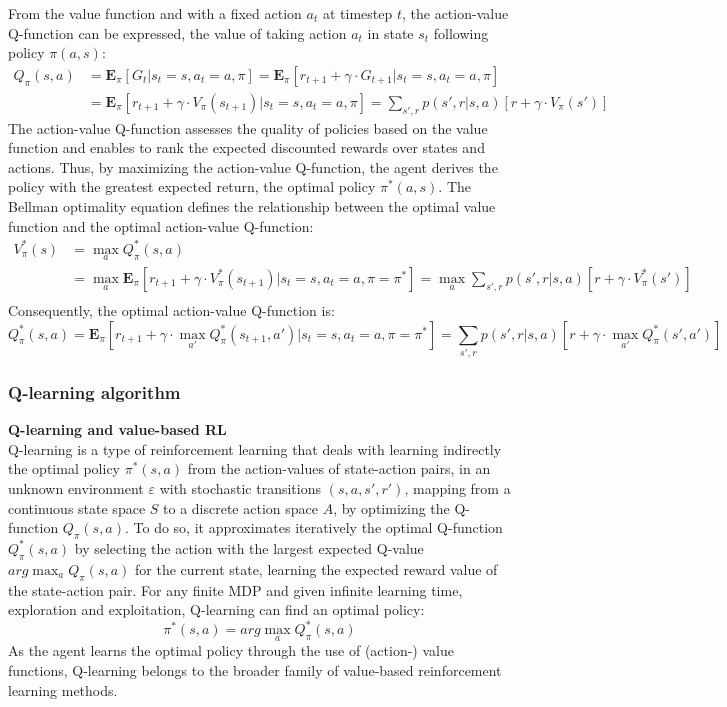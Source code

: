 From the value function and with a fixed action $a_t$ at timestep $t$, the action-value Q-function can be expressed, the value of taking action $a_t$ in state $s_t$ following policy $\pi(a,s)$:
\[
\begin{split}
Q_{\pi}(s,a) &= \mathbf{E}_{\pi}[G_t|s_t=s,a_t=a,\pi] = \mathbf{E}_{\pi}[r_{t+1} + \gamma \cdot G_{t+1}|s_t=s,a_t=a,\pi] \\
&= \mathbf{E}_{\pi}[r_{t+1}+\gamma \cdot V_{\pi}(s_{t+1})|s_t=s,a_t=a,\pi] = \sum_{s',r}p(s',r|s,a)[r+\gamma \cdot V_{\pi}(s')] 
\end{split}
\]
The action-value Q-function assesses the quality of policies based on the value function and enables to rank the expected discounted rewards over states and actions. Thus, by maximizing the action-value Q-function, the agent derives the policy with the greatest expected return, the optimal policy $\pi^*(a,s)$. The  Bellman optimality equation defines the relationship between the optimal value function and the optimal action-value Q-function:
\[ 
\begin{split}
V_\pi^*(s) &= \max_a Q_\pi^*(s,a) \\
&= \max_a \mathbf{E}_{\pi}[r_{t+1}+\gamma \cdot V_{\pi}^*(s_{t+1})|s_t=s,a_t=a,\pi=\pi^*] = \max_a \sum_{s',r}p(s',r|s,a)[r+\gamma \cdot V_{\pi}^*(s')] \\
\end{split}
\]
Consequently, the optimal action-value Q-function is:
\[ Q_\pi^*(s,a) = \mathbf{E}_{\pi}[r_{t+1}+\gamma \cdot \max_{a'} Q_\pi^*(s_{t+1},a')|s_t=s,a_t=a,\pi=\pi^*] = \sum_{s',r}p(s',r|s,a)[r+\gamma \cdot \max_{a'} Q_\pi^*(s',a')] \]

\subsubsection{Q-learning algorithm} \label{basics}

\textbf{Q-learning and value-based RL} \\
Q-learning is a type of reinforcement learning that deals with learning indirectly the optimal policy $\pi^*(s,a)$ from the action-values of state-action pairs, in an unknown environment $\varepsilon$ with stochastic transitions $(s,a,s',r')$, mapping from a continuous state space $S$ to a discrete action space $A$, by optimizing the Q-function $Q_\pi(s,a)$. To do so, it approximates iteratively the optimal Q-function $Q_\pi^*(s,a)$ by selecting the action with the largest expected Q-value $arg\max_{a} Q_\pi(s,a)$ for the current state, learning the expected reward value of the state-action pair. For any finite MDP and given infinite learning time, exploration and exploitation, Q-learning can find an optimal policy: 
\[ \pi^*(s,a) = arg\max_{a}Q_\pi^*(s,a) \]
As the agent learns the optimal policy through the use of (action-) value functions, Q-learning belongs to the broader family of value-based reinforcement learning methods. \\

